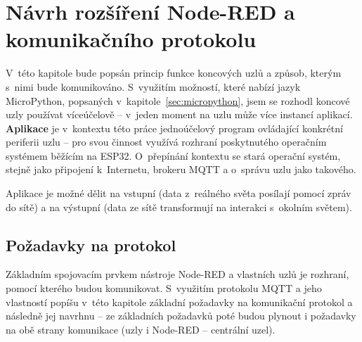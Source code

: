 \chapter{Návrh rozšíření Node-RED a komunikačního protokolu}
\label{ch:protokol}

V~této kapitole bude popsán princip funkce koncových uzlů a způsob, kterým s~nimi bude komunikováno.
S~využitím možností, které nabízí jazyk MicroPython, popsaných v~kapitole~\ref{sec:micropython}, jsem se rozhodl
koncové uzly používat víceúčelově -- v~jeden moment na uzlu může více instancí aplikací.
\textbf{Aplikace} je v~kontextu této práce jednoúčelový program ovládající konkrétní periferii uzlu -- pro svou činnost
využívá rozhraní poskytnutého operačním systémem běžícím na ESP32.
O~přepínání kontextu se stará operační systém, stejně jako připojení k~Internetu, brokeru MQTT a o~správu uzlu jako
takového.

Aplikace je možné dělit na vstupní (data z~reálného světa posílají pomocí zpráv do sítě) a na výstupní (data ze sítě
transformují na interakci s~okolním světem).

\section{Požadavky na protokol}\label{sec:pozadavky-na-protokol}
Základním spojovacím prvkem nástroje Node-RED a vlastních uzlů je rozhraní, pomocí kterého budou
komunikovat.
S~využitím protokolu MQTT a jeho vlastností popíšu v~této kapitole základní požadavky na komunikační protokol a
následně jej navrhnu -- ze základních požadavků poté budou plynout i požadavky na obě strany komunikace (uzly i
Node-RED -- centrální uzel).


